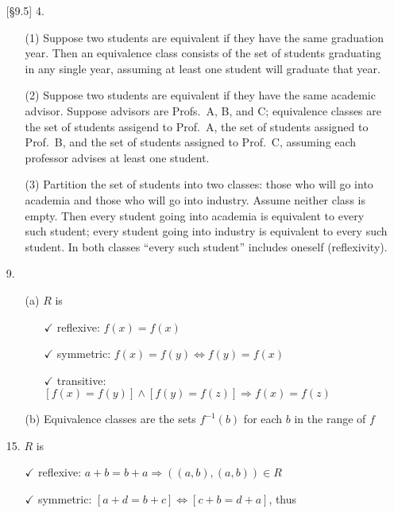 \documentclass{article}
\begin{document}
\begin{enumerate}
    \item[{[\S 9.5]} 4.]
        \begin{itemize}
            \item[(1)] Suppose two students are equivalent if they have the same graduation year. Then an equivalence class consists of the set of students graduating in any single year, assuming at least one student will graduate that year.
            \item[(2)] Suppose two students are equivalent if they have the same academic advisor. Suppose advisors are Profs.~A, B, and C; equivalence classes are the set of students assigend to Prof.~A, the set of students assigned to Prof.~B, and the set of students assigned to Prof.~C, assuming each professor advises at least one student.
            \item[(3)] Partition the set of students into two classes: those who will go into academia and those who will go into industry. Assume neither class is empty. Then every student going into academia is equivalent to every such student; every student going into industry is equivalent to every such student. In both classes ``every such student'' includes oneself (reflexivity).
        \end{itemize}
    \item[9.]
        \begin{itemize}
            \item[(a)] $R$ is
                \begin{itemize}
                    \item[$\checkmark$] reflexive: $f(x) = f(x)$
                    \item[$\checkmark$] symmetric: $f(x) = f(y) \Leftrightarrow f(y) = f(x)$
                    \item[$\checkmark$] transitive: $[f(x)=f(y)] \land [f(y)=f(z)] \Rightarrow f(x)=f(z)$
                \end{itemize}
            \item[(b)] Equivalence classes are the sets $f^{-1}(b)$ for each $b$ in the range of $f$
        \end{itemize}
    \item[15.] $R$ is
        \begin{itemize}
            \item[$\checkmark$] reflexive: $a+b = b+a \Rightarrow ((a,b), (a,b)) \in R$
            \item[$\checkmark$] symmetric: $[a+d = b+c] \Leftrightarrow [c+b = d+a]$, thus

\end{itemize}
\end{enumerate}
\end{document}
